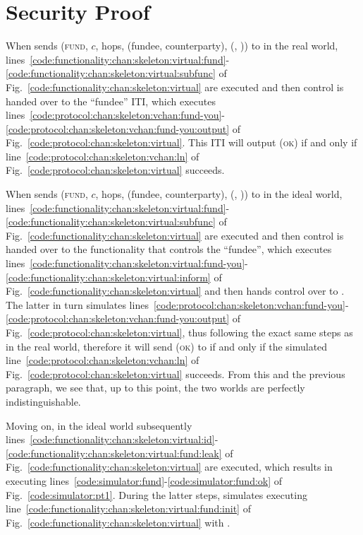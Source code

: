 \section{Security Proof}
  When \environment sends (\textsc{fund}, $c$, hops, (fundee, counterparty),
  (\charlie, \dave)) to \alice in the real world,
  lines~\ref{code:functionality:chan:skeleton:virtual:fund}-\ref{code:functionality:chan:skeleton:virtual:subfunc}
  of Fig.~\ref{code:functionality:chan:skeleton:virtual} are executed and then
  control is handed over to the ``fundee'' ITI, which executes
  lines~\ref{code:protocol:chan:skeleton:vchan:fund-you}-\ref{code:protocol:chan:skeleton:vchan:fund-you:output}
  of Fig.~\ref{code:protocol:chan:skeleton:virtual}.  This ITI will output
  (\textsc{ok}) if and only if line~\ref{code:protocol:chan:skeleton:vchan:ln}
  of Fig.~\ref{code:protocol:chan:skeleton:virtual} succeeds.

  When \environment sends (\textsc{fund}, $c$, hops, (fundee, counterparty),
  (\charlie, \dave)) to \alice in the ideal world,
  lines~\ref{code:functionality:chan:skeleton:virtual:fund}-\ref{code:functionality:chan:skeleton:virtual:subfunc}
  of Fig.~\ref{code:functionality:chan:skeleton:virtual} are executed and then
  control is handed over to the functionality that controls the ``fundee'',
  which executes
  lines~\ref{code:functionality:chan:skeleton:virtual:fund-you}-\ref{code:functionality:chan:skeleton:virtual:inform}
  of Fig.~\ref{code:functionality:chan:skeleton:virtual} and then hands control
  over to \simulator. The latter in turn simulates
  lines~\ref{code:protocol:chan:skeleton:vchan:fund-you}-\ref{code:protocol:chan:skeleton:vchan:fund-you:output}
  of Fig.~\ref{code:protocol:chan:skeleton:virtual}, thus following the exact
  same steps as in the real world, therefore it will send (\textsc{ok}) to
  \fchan if and only if the simulated
  line~\ref{code:protocol:chan:skeleton:vchan:ln} of
  Fig.~\ref{code:protocol:chan:skeleton:virtual} succeeds. From this and the
  previous paragraph, we see that, up to this point, the two worlds are
  perfectly indistinguishable.

  Moving on, in the ideal world subsequently
  lines~\ref{code:functionality:chan:skeleton:virtual:id}-\ref{code:functionality:chan:skeleton:virtual:fund:leak}
  of Fig.~\ref{code:functionality:chan:skeleton:virtual} are executed, which
  results in \simulator executing
  lines~\ref{code:simulator:fund}-\ref{code:simulator:fund:ok} of
  Fig.~\ref{code:simulator:pt1}. During the latter steps, \simulator simulates
  executing line~\ref{code:functionality:chan:skeleton:virtual:fund:init} of
  Fig.~\ref{code:functionality:chan:skeleton:virtual} with \alice.

